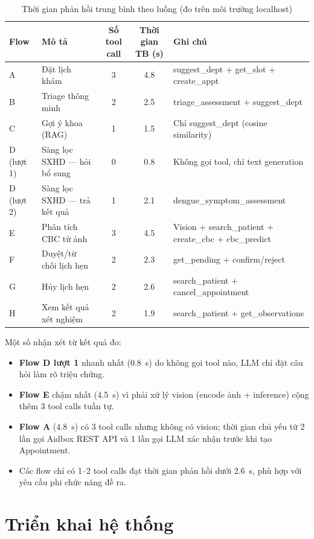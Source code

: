 \documentclass[oneside, a4paper]{book}
\theoremstyle{plain}
\theoremstyle{plain}
\theoremstyle{definition}
\theoremstyle{remark}
\begin{document}
\begin{table}[H]
\centering
\begin{tabular}{|l|p{3.8cm}|c|c|p{4.2cm}|}
\hline
\textbf{Flow} & \textbf{Mô tả} & \textbf{Số tool call} & \textbf{Thời gian TB (s)} & \textbf{Ghi chú} \\
\hline
A & Đặt lịch khám & 3 & 4.8 & suggest\_dept + get\_slot + create\_appt \\
B & Triage thông minh & 2 & 2.5 & triage\_assessment + suggest\_dept \\
C & Gợi ý khoa (RAG) & 1 & 1.5 & Chỉ suggest\_dept (cosine similarity) \\
D (lượt 1) & Sàng lọc SXHD --- hỏi bổ sung & 0 & 0.8 & Không gọi tool, chỉ text generation \\
D (lượt 2) & Sàng lọc SXHD --- trả kết quả & 1 & 2.1 & dengue\_symptom\_assessment \\
E & Phân tích CBC từ ảnh & 3 & 4.5 & Vision + search\_patient + create\_cbc + cbc\_predict \\
F & Duyệt/từ chối lịch hẹn & 2 & 2.3 & get\_pending + confirm/reject \\
G & Hủy lịch hẹn & 2 & 2.6 & search\_patient + cancel\_appointment \\
H & Xem kết quả xét nghiệm & 2 & 1.9 & search\_patient + get\_observations \\
\hline
\end{tabular}
\caption{Thời gian phản hồi trung bình theo luồng (đo trên môi trường localhost)}
\label{tab:perf}
\end{table}

Một số nhận xét từ kết quả đo:
\begin{itemize}
  \item \textbf{Flow D lượt 1} nhanh nhất (0.8~s) do không gọi tool nào, LLM chỉ đặt câu hỏi làm rõ triệu chứng.
  \item \textbf{Flow E} chậm nhất (4.5~s) vì phải xử lý vision (encode ảnh + inference) cộng thêm 3 tool calls tuần tự.
  \item \textbf{Flow A} (4.8~s) có 3 tool calls nhưng không có vision; thời gian chủ yếu từ 2 lần gọi Aidbox REST API và 1 lần gọi LLM xác nhận trước khi tạo Appointment.
  \item Các flow chỉ có 1--2 tool calls đạt thời gian phản hồi dưới 2.6~s, phù hợp với yêu cầu phi chức năng đề ra.
\end{itemize}

\section{Triển khai hệ thống}
\end{document}
